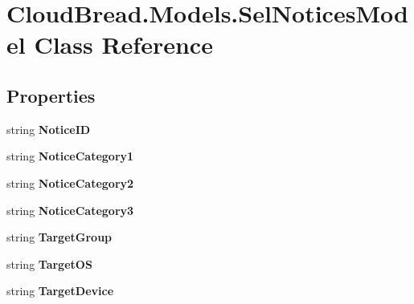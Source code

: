 \hypertarget{a00103}{}\section{Cloud\+Bread.\+Models.\+Sel\+Notices\+Model Class Reference}
\label{a00103}
\subsection*{Properties}
\begin{DoxyCompactItemize}
\item 
string {\bfseries Notice\+ID}\hypertarget{a00103_af33cc7c2746b0caa4a62d16ad62eaea2}{}\label{a00103_af33cc7c2746b0caa4a62d16ad62eaea2}

\item 
string {\bfseries Notice\+Category1}\hypertarget{a00103_ad0a2d97bde5ef4a2d2fed0325ca07198}{}\label{a00103_ad0a2d97bde5ef4a2d2fed0325ca07198}

\item 
string {\bfseries Notice\+Category2}\hypertarget{a00103_a2fba85edf48a88b2292d21942db86992}{}\label{a00103_a2fba85edf48a88b2292d21942db86992}

\item 
string {\bfseries Notice\+Category3}\hypertarget{a00103_ac40a97eaecb6a080bb2ca546f20ef413}{}\label{a00103_ac40a97eaecb6a080bb2ca546f20ef413}

\item 
string {\bfseries Target\+Group}\hypertarget{a00103_a47689fd21b5f52c3fcfb1f4bf1ef12ea}{}\label{a00103_a47689fd21b5f52c3fcfb1f4bf1ef12ea}

\item 
string {\bfseries Target\+OS}\hypertarget{a00103_abfe0747573facc0819f0d0155ae8fac6}{}\label{a00103_abfe0747573facc0819f0d0155ae8fac6}

\item 
string {\bfseries Target\+Device}\hypertarget{a00103_a9d0f198dc804f654bad990b39b29d671}{}\label{a00103_a9d0f198dc804f654bad990b39b29d671}


\end{DoxyCompactItemize}
